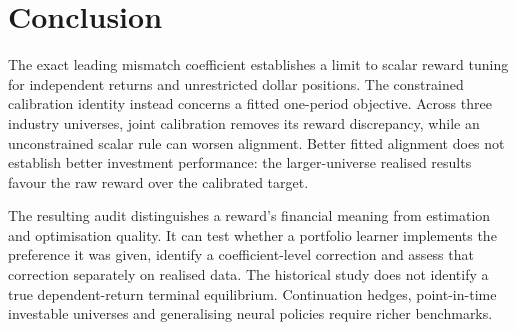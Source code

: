 \documentclass[sigconf,anonymous,review]{acmart}
\begin{document}
\section{Conclusion}
The exact leading mismatch coefficient establishes a limit to scalar reward tuning for independent returns and unrestricted dollar positions. The constrained calibration identity instead concerns a fitted one-period objective. Across three industry universes, joint calibration removes its reward discrepancy, while an unconstrained scalar rule can worsen alignment. Better fitted alignment does not establish better investment performance: the larger-universe realised results favour the raw reward over the calibrated target.

The resulting audit distinguishes a reward's financial meaning from estimation and optimisation quality. It can test whether a portfolio learner implements the preference it was given, identify a coefficient-level correction and assess that correction separately on realised data. The historical study does not identify a true dependent-return terminal equilibrium. Continuation hedges, point-in-time investable universes and generalising neural policies require richer benchmarks.
\end{document}
